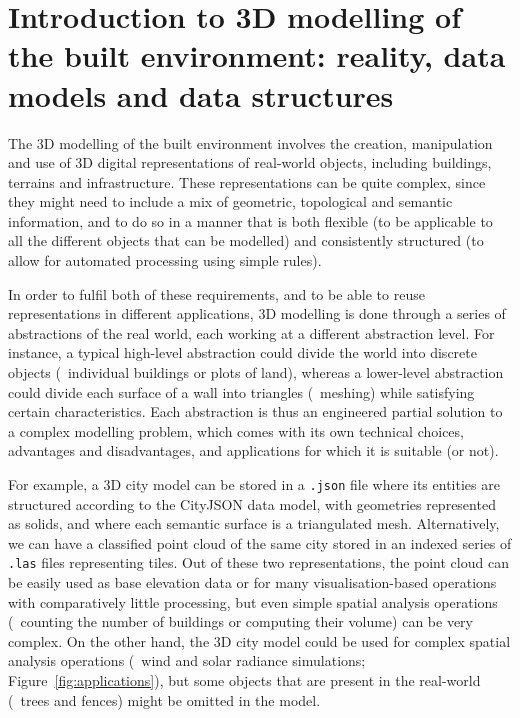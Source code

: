 
\setchapterpreamble[u]{\margintoc}

\graphicspath{{dmds/}}
\renewcommand*{\thelesson}{1.1}

\chapter{Introduction to 3D modelling of the built environment: reality, data models and data structures}%
\label{chap:dmds}

The 3D modelling of the built environment involves the creation, manipulation and use of 3D digital representations of real-world objects, including buildings, terrains and infrastructure.
These representations can be quite complex, since they might need to include a mix of geometric, topological and semantic information, and to do so in a manner that is both flexible (to be applicable to all the different objects that can be modelled) and consistently structured (to allow for automated processing using simple rules).

In order to fulfil both of these requirements, and to be able to reuse representations in different applications, 3D modelling is done through a series of abstractions of the real world, each working at a different abstraction level.
For instance, a typical high-level abstraction could divide the world into discrete objects (\eg\ individual buildings or plots of land), whereas a lower-level abstraction could divide each surface of a wall into triangles (\ie\ meshing) while satisfying certain characteristics.
Each abstraction is thus an engineered partial solution to a complex modelling problem, which comes with its own technical choices, advantages and disadvantages, and applications for which it is suitable (or not).

For example, a 3D city model can be stored in a \texttt{.json} file where its entities are structured according to the CityJSON data model, with geometries represented as solids, and where each semantic surface is a triangulated mesh.
Alternatively, we can have a classified point cloud of the same city stored in an indexed series of \texttt{.las} files representing tiles.
Out of these two representations, the point cloud can be easily used as base elevation data or for many visualisation-based operations with comparatively little processing, but even simple spatial analysis operations (\eg\ counting the number of buildings or computing their volume) can be very complex.
On the other hand, the 3D city model could be used for complex spatial analysis operations (\eg\ wind and solar radiance simulations; Figure~\ref{fig:applications}), but some objects that are present in the real-world (\eg\ trees and fences) might be omitted in the model.

